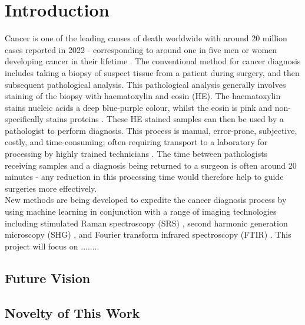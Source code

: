 \section{Introduction}
\noindent
Cancer is one of the leading causes of death worldwide with around 20 million cases reported in 2022 - corresponding to around one in five men or women developing cancer in their lifetime \cite{bray_global_2024}. The conventional method for cancer diagnosis includes taking a biopsy of suspect tissue from a patient during surgery, and then subsequent pathological analysis. This pathological analysis generally involves staining of the biopsy with haematoxylin and eosin (HE). The haematoxylin stains nucleic acids a deep blue-purple colour, whilst the eosin is pink and non-specifically stains proteins \cite{fischer_hematoxylin_2008}. These HE stained samples can then be used by a pathologist to perform diagnosis. This process is manual, error-prone, subjective, costly, and time-consuming; often requiring transport to a laboratory for processing by highly trained technicians \cite{hollon_near_2020}. The time between pathologists receiving samples and a diagnosis being returned to a surgeon is often around 20 minutes \cite{novis_interinstitutional_1997} - any reduction in this processing time would therefore help to guide surgeries more effectively.\\

New methods are being developed to expedite the cancer diagnosis process by using machine learning in conjunction with a range of imaging technologies including stimulated Raman spectroscopy (SRS) \cite{hollon_near_2020, sarri_fast_2019, kondepudi_foundation_2024, jiang_opensrh_2022}, second harmonic generation microscopy (SHG) \cite{sarri_fast_2019}, and Fourier transform infrared spectroscopy (FTIR) \cite{tomas_detection_2022, berisha_deep_2019}. This project will focus on ........
\subsection{Future Vision}
\subsection{Novelty of This Work}